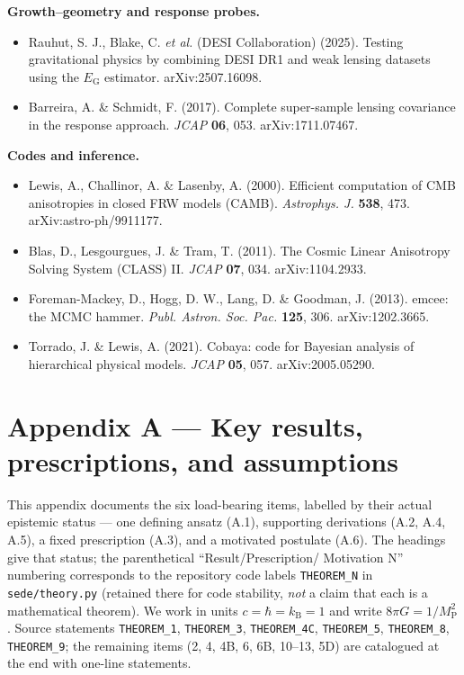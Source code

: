 \documentclass[
  10pt,
]{article}
\providecommand{\tightlist}{%
  \setlength{\itemsep}{0pt}\setlength{\parskip}{0pt}}
\begin{document}
\textbf{Growth--geometry and response probes.}

\begin{itemize}
\tightlist
\item
  Rauhut, S. J., Blake, C. \emph{et al.} (DESI Collaboration) (2025).
  Testing gravitational physics by combining DESI DR1 and weak lensing
  datasets using the \(E_{\mathrm{G}}\) estimator. arXiv:2507.16098.
\item
  Barreira, A. \& Schmidt, F. (2017). Complete super-sample lensing
  covariance in the response approach. \emph{JCAP} \textbf{06}, 053.
  arXiv:1711.07467.
\end{itemize}

\textbf{Codes and inference.}

\begin{itemize}
\tightlist
\item
  Lewis, A., Challinor, A. \& Lasenby, A. (2000). Efficient computation
  of CMB anisotropies in closed FRW models (CAMB). \emph{Astrophys. J.}
  \textbf{538}, 473. arXiv:astro-ph/9911177.
\item
  Blas, D., Lesgourgues, J. \& Tram, T. (2011). The Cosmic Linear
  Anisotropy Solving System (CLASS) II. \emph{JCAP} \textbf{07}, 034.
  arXiv:1104.2933.
\item
  Foreman-Mackey, D., Hogg, D. W., Lang, D. \& Goodman, J. (2013).
  emcee: the MCMC hammer. \emph{Publ. Astron. Soc. Pac.} \textbf{125},
  306. arXiv:1202.3665.
\item
  Torrado, J. \& Lewis, A. (2021). Cobaya: code for Bayesian analysis of
  hierarchical physical models. \emph{JCAP} \textbf{05}, 057.
  arXiv:2005.05290.
\end{itemize}

\section{Appendix A --- Key results, prescriptions, and
assumptions}\label{appendix-a-key-results-prescriptions-and-assumptions}

This appendix documents the six load-bearing items, labelled by their
actual epistemic status --- one defining ansatz (A.1), supporting
derivations (A.2, A.4, A.5), a fixed prescription (A.3), and a motivated
postulate (A.6). The headings give that status; the parenthetical
``Result/Prescription/ Motivation N'' numbering corresponds to the
repository code labels \texttt{THEOREM\_N} in \texttt{sede/theory.py}
(retained there for code stability, \emph{not} a claim that each is a
mathematical theorem). We work in units
\(c = \hbar  = k_{\mathrm{B}} = 1\) and write
\(8\pi G = 1/M_{\mathrm{P}}^{2}\). Source statements
\texttt{THEOREM\_1}, \texttt{THEOREM\_3}, \texttt{THEOREM\_4C},
\texttt{THEOREM\_5}, \texttt{THEOREM\_8}, \texttt{THEOREM\_9}; the
remaining items (2, 4, 4B, 6, 6B, 10--13, 5D) are catalogued at the end
with one-line statements.
\end{document}
